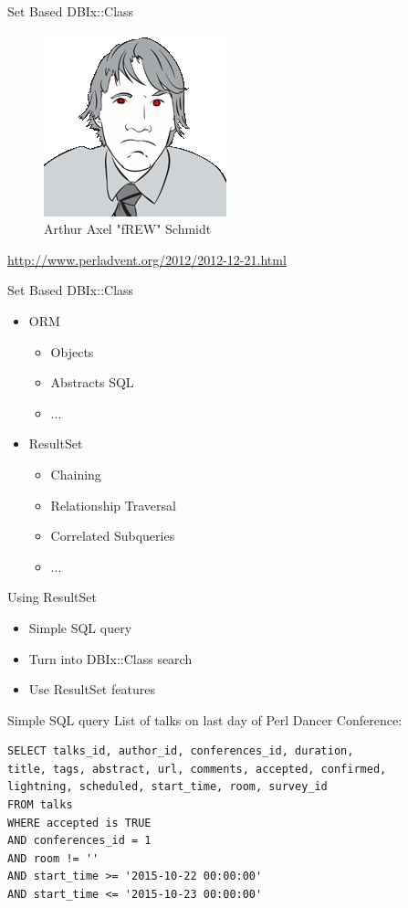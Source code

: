 \begin{frame}[fragile]{Set Based DBIx::Class}
\begin{figure}[!ht]
\centering
\includegraphics[width=0.4\linewidth]{img/frew.png}
\caption{Arthur Axel "fREW" Schmidt}
\end{figure}
\centering
\href{http://www.perladvent.org/2012/2012-12-21.html}{http://www.perladvent.org/2012/2012-12-21.html}
\end{frame}

\begin{frame}{Set Based DBIx::Class}
\begin{itemize}
\item ORM
\begin{itemize}
\item Objects
\item Abstracts SQL
\item ...
\end{itemize}
\item ResultSet
\begin{itemize}
\item Chaining
\item Relationship Traversal
\item Correlated Subqueries
\item ...
\end{itemize}
\end{itemize}
\end{frame}

\begin{frame}{Using ResultSet}
\begin{itemize}
\item Simple SQL query
\item Turn into DBIx::Class search
\item Use ResultSet features
\end{itemize}
\end{frame}

\begin{frame}[fragile]{Simple SQL query}
List of talks on last day of Perl Dancer Conference:
\begin{lstlisting}
SELECT talks_id, author_id, conferences_id, duration,
title, tags, abstract, url, comments, accepted, confirmed, 
lightning, scheduled, start_time, room, survey_id 
FROM talks 
WHERE accepted is TRUE 
AND conferences_id = 1 
AND room != '' 
AND start_time >= '2015-10-22 00:00:00'
AND start_time <= '2015-10-23 00:00:00'
\end{lstlisting}
\end{frame}

